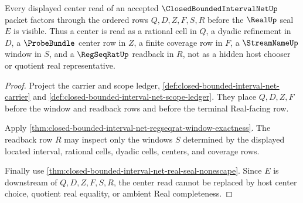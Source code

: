 \begin{theorem}
\label{thm:closed-bounded-interval-net-cell-center-readback}
Every displayed center read of an accepted $\ClosedBoundedIntervalNetUp$ packet factors through the ordered rows $Q,D,Z,F,S,R$ before the $\RealUp$ seal $E$ is visible. Thus a center is read as a rational cell in $Q$, a dyadic refinement in $D$, a $\ProbeBundle$ center row in $Z$, a finite coverage row in $F$, a $\StreamNameUp$ window in $S$, and a $\RegSeqRatUp$ readback in $R$, not as a hidden host chooser or quotient real representative.
\end{theorem}
\begin{proof}
Project the carrier and scope ledger, \autoref{def:closed-bounded-interval-net-carrier} and \autoref{def:closed-bounded-interval-net-scope-ledger}. They place $Q,D,Z,F$ before the window and readback rows and before the terminal Real-facing row.

Apply \autoref{thm:closed-bounded-interval-net-regseqrat-window-exactness}. The readback row $R$ may inspect only the windows $S$ determined by the displayed located interval, rational cells, dyadic cells, centers, and coverage rows.

Finally use \autoref{thm:closed-bounded-interval-net-real-seal-nonescape}. Since $E$ is downstream of $Q,D,Z,F,S,R$, the center read cannot be replaced by host center choice, quotient real equality, or ambient Real completeness.
\end{proof}


